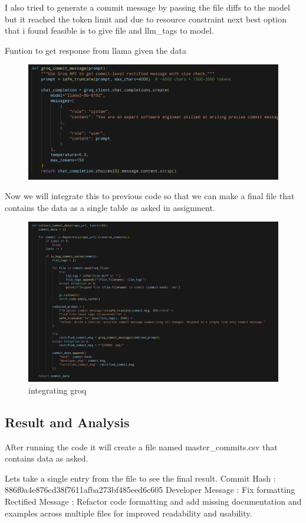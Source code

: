 \documentclass[a4paper,12pt,twoside,english]{all-in-one} %
\begin{document}
I also tried to generate a commit message by passing the file diffs to the model but it reached the token limit and due to resource constraint next best option that i found feasible is to give file and llm\_tags to model.

Funtion to get response from llama given the data
\begin{figure}
    \centering
    \includegraphics[width=0.75\linewidth]{image24.png}
    \label{fig:placeholder}
\end{figure}


Now we will integrate this to previous code so that we can make a final file that contains the data as a single table as asked in assignment.
\begin{figure}
    \centering
    \includegraphics[width=0.75\linewidth]{image25.png}
    \caption{integrating groq}
    \label{fig:placeholder}
\end{figure}


\subsection{Result and Analysis}
After running the code it will create a file named master\_commits.csv that contains data as asked.

Lets take a single entry from the file to see the final result.
Commit Hash : 886f0a4e876cd38f7611afba273bf485eed6c605
Developer Message : Fix formatting
Rectified Message : Refactor code formatting and add missing documentation and examples across multiple files for improved readability and usability.
\end{document}
